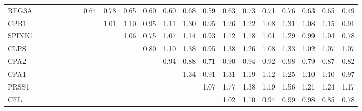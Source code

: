 \begin{longtable}{lrrrrrrrrrrrrrrrrrrrr}
REG3A    &              &              &              &             &             &             &       0.64 &         0.78 &       0.65 &       0.60 &       0.60 &        0.68 &      0.59 &        0.63 &           0.73 &          0.71 &      0.76 &        0.63 &        0.65 &       0.49 \\
CPB1     &              &              &              &             &             &             &            &         1.01 &       1.10 &       0.95 &       1.11 &        1.30 &      0.95 &        1.26 &           1.22 &          1.08 &      1.31 &        1.08 &        1.15 &       0.91 \\
SPINK1   &              &              &              &             &             &             &            &              &       1.06 &       0.75 &       1.07 &        1.14 &      0.93 &        1.12 &           1.18 &          1.01 &      1.29 &        0.99 &        1.04 &       0.78 \\
CLPS     &              &              &              &             &             &             &            &              &            &       0.80 &       1.10 &        1.38 &      0.95 &        1.38 &           1.26 &          1.08 &      1.33 &        1.02 &        1.07 &       1.07 \\
CPA2     &              &              &              &             &             &             &            &              &            &            &       0.94 &        0.88 &      0.71 &        0.90 &           0.94 &          0.92 &      0.98 &        0.79 &        0.87 &       0.82 \\
CPA1     &              &              &              &             &             &             &            &              &            &            &            &        1.34 &      0.91 &        1.31 &           1.19 &          1.12 &      1.25 &        1.10 &        1.10 &       0.97 \\
PRSS1    &              &              &              &             &             &             &            &              &            &            &            &             &      1.07 &        1.77 &           1.38 &          1.19 &      1.56 &        1.21 &        1.24 &       1.17 \\
CEL      &              &              &              &             &             &             &            &              &            &            &            &             &           &        1.02 &           1.10 &          0.94 &      0.99 &        0.98 &        0.85 &       0.78 \\

\end{longtable}
